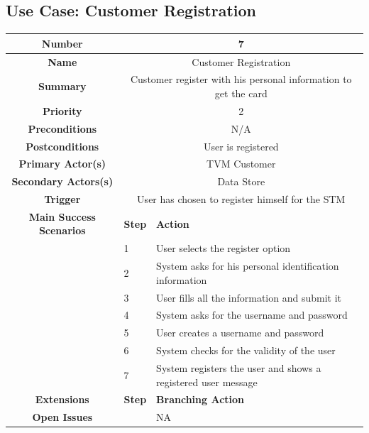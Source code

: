 \documentclass[a4paper,12pt]{report}
\begin{document}


\subsection{Use Case: Customer Registration}
\begin{tabular}{ | c | p{2cm} | p{7cm} |}
	
	\hline
	\textbf{Number} & \multicolumn{2}{c|}{7}  \\
	\hline
	\textbf{Name} & \multicolumn{2}{c|}{Customer Registration}  \\
	\hline
	\textbf{Summary} & \multicolumn{2}{c|}{Customer register with his personal information to get the card}  \\
	\hline
	\textbf{Priority} & \multicolumn{2}{c|}{2}  \\
	\hline
	\textbf{Preconditions} & \multicolumn{2}{c|}{N/A}  \\
	\hline
	\textbf{Postconditions} & \multicolumn{2}{c|}{User is registered}  \\
	\hline
	\textbf{Primary Actor(s)} & \multicolumn{2}{c|}{TVM Customer}  \\
	\hline
	\textbf{Secondary Actors(s)} & \multicolumn{2}{c|}{Data Store}  \\
	\hline
	\textbf{Trigger} & \multicolumn{2}{c|}{User has chosen to register himself for the STM} \\
	\hline
	\textbf{Main Success Scenarios} & \textbf{Step} & \textbf{Action} \\
	\hline
	& 1 & User selects the register option \\ 
	\hline
	&  2  & System asks for his personal identification information \\
	\hline
	&  3  & User fills all the information and submit it \\
	\hline
	&  4  & System asks for the username and password \\
	\hline
	&  5  & User creates a username and password \\
	\hline
	&  6  & System checks for the validity of the user \\
	\hline
	&  7  & System registers the user and shows a registered user message \\
	\hline

	\textbf{Extensions} & \textbf{Step} & \textbf{Branching Action} \\
	\hline
	\textbf{Open Issues} &    & NA \\
	\hline

\end{tabular}
\end{document}
